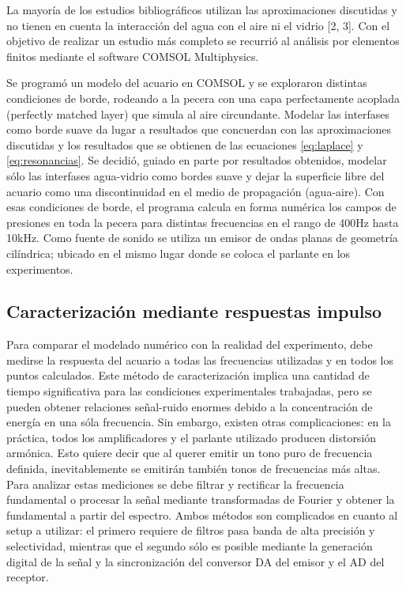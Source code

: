 La mayoría de los estudios bibliográficos utilizan las aproximaciones discutidas y no tienen en cuenta la interacción del agua con el aire ni el vidrio [2, 3]. Con el objetivo de realizar un estudio más completo se recurrió al análisis por elementos finitos mediante el software COMSOL Multiphysics.

Se programó un modelo del acuario en COMSOL y se exploraron distintas condiciones de borde, rodeando a la pecera con una capa perfectamente acoplada (perfectly matched layer) que simula al aire circundante.  Modelar las interfases como borde suave da lugar a resultados que concuerdan con las aproximaciones discutidas y los resultados que se obtienen de las ecuaciones \ref{eq:laplace} y \ref{eq:resonancias}. Se decidió, guiado en parte por resultados obtenidos, modelar sólo las interfases agua-vidrio como bordes suave y dejar la superficie libre del acuario como una discontinuidad en el medio de propagación (agua-aire). Con esas condiciones de borde, el programa calcula en forma numérica los campos de presiones en toda la pecera para distintas frecuencias en el rango de 400Hz hasta 10kHz. Como fuente de sonido se utiliza un emisor de ondas planas de geometría cilíndrica; ubicado en el mismo lugar donde se coloca el parlante en los experimentos.

\subsection{Caracterización mediante respuestas impulso}
\label{sec:introsweeps}

Para comparar el modelado numérico con la realidad del experimento, debe medirse la respuesta del acuario a todas las frecuencias utilizadas y en todos los puntos calculados. Este método de caracterización implica una cantidad de tiempo significativa para las condiciones experimentales trabajadas, pero se pueden obtener relaciones señal-ruido enormes debido a la concentración de energía en una sóla frecuencia. Sin embargo, existen otras complicaciones: en la práctica, todos los amplificadores y el parlante utilizado producen distorsión armónica. Esto quiere decir que al querer emitir un tono puro de frecuencia definida, inevitablemente se emitirán también tonos de frecuencias más altas. Para analizar estas mediciones se debe filtrar y rectificar la frecuencia fundamental o procesar la señal mediante transformadas de Fourier y obtener la fundamental a partir del espectro. Ambos métodos son complicados en cuanto al setup a utilizar: el primero requiere de filtros pasa banda de alta precisión y selectividad, mientras que el segundo sólo es posible mediante la generación digital de la señal y la sincronización del conversor DA del emisor y el AD del receptor. 

